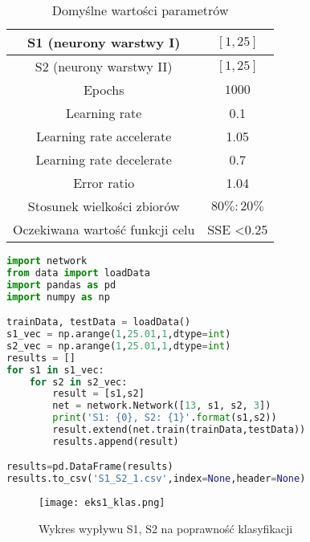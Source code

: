 \documentclass[12pt,twoside]{article}
\begin{document}
\begin{table}[H]
\begin{center}
\begin{tabular}{|c|c|}
\hline
S1 (neurony warstwy I) & $[1, 25]$\\
\hline
S2 (neurony warstwy II) & $[1, 25]$\\
\hline
Epochs & $1000$\\
\hline
Learning rate & 0.1\\
\hline
Learning rate accelerate & 1.05\\
\hline
Learning rate decelerate & 0.7\\
\hline
Error ratio & 1.04\\
\hline
Stosunek wielkości zbiorów & $80\% : 20\%$\\
\hline
Oczekiwana wartość funkcji celu & SSE <0.25\\
\hline
\end{tabular}
\caption{Domyślne wartości parametrów}
\label{tab2}
\end{center}
\end{table}

\begin{lstlisting}[language=Python,caption=Algorytm realizujący eksperyment 1,label={eks1}]
import network
from data import loadData
import pandas as pd
import numpy as np

trainData, testData = loadData()
s1_vec = np.arange(1,25.01,1,dtype=int)
s2_vec = np.arange(1,25.01,1,dtype=int)
results = []
for s1 in s1_vec:
	for s2 in s2_vec:
		result = [s1,s2]
		net = network.Network([13, s1, s2, 3])
		print('S1: {0}, S2: {1}'.format(s1,s2))
		result.extend(net.train(trainData,testData))
		results.append(result)

results=pd.DataFrame(results)
results.to_csv('S1_S2_1.csv',index=None,header=None)


\end{lstlisting}


\begin{figure}[H]
\label{eks1_klas}
\centering
\texttt{[image: eks1\_klas.png]}
\caption{Wykres wypływu S1, S2 na poprawność klasyfikacji}
\end{figure}
\end{document}

